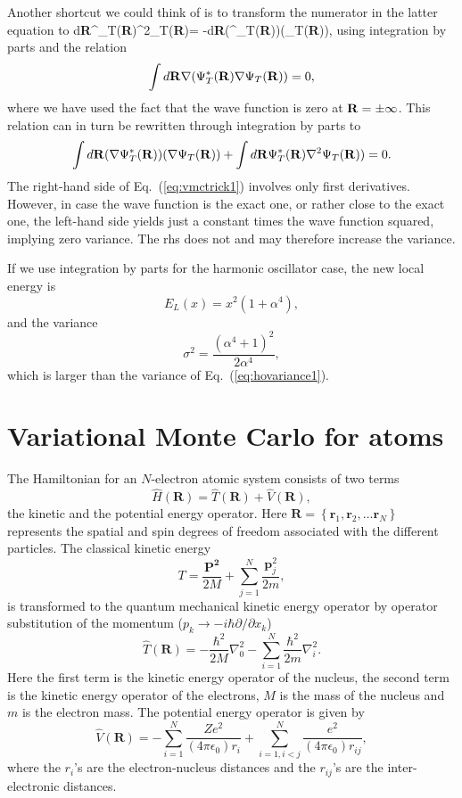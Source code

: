 Another shortcut we could think of is to transform the numerator in the 
latter equation to
\be
   \int d{\bf R}\Psi^{\ast}_T({\bf R})\nabla^2\Psi_T({\bf R})=
    -\int d{\bf R}(\nabla\Psi^{\ast}_T({\bf R}))(\nabla\Psi_T({\bf R})),
    \label{eq:vmctrick1}
\ee
using integration by parts and the relation
\[
   \int d{\bf R}\nabla(\Psi^{\ast}_T({\bf R})\nabla\Psi_T({\bf R}))=0,
\]
where we have used the fact that the wave function is zero at 
${\bf R}=\pm \infty$. This relation can in turn be rewritten through
integration by parts to
\[
   \int d{\bf R}(\nabla\Psi^{\ast}_T({\bf R}))(\nabla\Psi_T({\bf R}))+
    \int d{\bf R}\Psi^{\ast}_T({\bf R})\nabla^2\Psi_T({\bf R}))=0.
\]
The right-hand side of Eq.~(\ref{eq:vmctrick1}) involves only first derivatives. 
However, in case the wave function is the exact one, or rather
close to the exact one, the left-hand side yields just a constant  times the 
wave function squared, implying zero variance. The rhs does not
and may therefore increase the variance.

If we use integration by parts for the harmonic oscillator case, 
the new local energy is 
\[
  E_L(x)=x^2(1+\alpha^4),
\] 
and the variance 
\[
  \sigma^2=\frac{(\alpha^4+1)^2}{2\alpha^4},
\]
which is larger than the variance of Eq.~(\ref{eq:hovariance1}). 





\section{Variational Monte Carlo for atoms}

The Hamiltonian for an $N$-electron atomic system consists of two terms
\begin{equation}
  \hat{H}(\mathbf{R}) 
  = \hat{T}(\mathbf{R}) 
  + \hat{V}(\mathbf{R}), 
\label{hamiltonOperatorFull}
\end{equation}
the kinetic and the potential energy operator. Here $\mathbf{R} =
\left\{ \mathbf{r}_1, \mathbf{r}_2, \dots \mathbf{r}_N \right\}$  represents
the spatial and spin degrees of freedom associated with the different
particles. The classical kinetic energy
\[
  T= \frac{\mathbf{P^2}}{2M} + \sum_{j=1}^N \frac{\mathbf{p}_j^2}{2m},
\]
is transformed to the quantum mechanical kinetic energy operator by 
operator substitution of the momentum ($p_k \to -i\hbar
\partial/\partial x_k$)
\begin{equation}
  \hat{T}(\mathbf{R}) = -\frac{\hbar^2}{2M}\nabla^2_0
  -\sum_{i=1}^{N}\frac{\hbar^2}{2m}\nabla^2_i.
\label{kineticEnergyOperatorFull}
\end{equation}
Here the first term is the kinetic energy operator of the nucleus,
the second term is the kinetic energy operator of the electrons,
$M$ is the mass of the nucleus and $m$ is the electron mass. The
potential energy operator is given by
\begin{equation}
  \hat{V}(\mathbf{R}) = 
  - \sum_{i=1}^{N} \frac{Ze^2}{(4\pi \epsilon_0)r_i}
  + \sum_{i=1,i<j}^{N} \frac{e^2}{(4\pi \epsilon_0)r_{ij}},
\label{potentialEnergyOperatorFull}
\end{equation}
where the $r_i$'s are the electron-nucleus distances and the
$r_{ij}$'s are the inter-electronic distances. 

